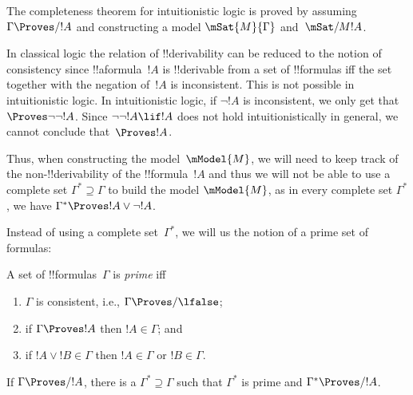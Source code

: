 \documentclass[../../../include/open-logic-section]{subfiles}
\begin{document}

The completeness theorem for intuitionistic logic is proved by assuming
$\Gamma \Proves/ !A$ and constructing a model $\mSat{M}{\Gamma}$ and~$\mSat/{M}{!A}$.

In classical logic the relation of !!{derivability} can be reduced to
the notion of consistency since !!a{formula}~$!A$ is !!{derivable}
from a set of !!{formula}s iff the set together with the negation
of~$!A$ is inconsistent. This is not possible in intuitionistic logic.
In intuitionistic logic, if $\lnot!A$ is inconsistent, we only get
that $\Proves \lnot\lnot !A$. Since $\lnot\lnot!A \lif !A$ does not
hold intuitionistically in general, we cannot conclude that~$\Proves
!A$.

Thus, when constructing the model~$\mModel{M}$, we will need to keep track 
of the non-!!{derivability} of the !!{formula}~$!A$ and thus we will not be 
able to use a complete set $\Gamma^* \supseteq \Gamma$ to build the model
$\mModel{M}$, as in every complete set $\Gamma^*$, we have
$\Gamma^* \Proves !A \lor \lnot !A$.

Instead of using a complete set~$\Gamma^*$, we will us the notion of
a prime set of formulas:

\begin{defn}
  A set of !!{formula}s~$\Gamma$ is \emph{prime} iff 
  \begin{enumerate}
  \item{} $\Gamma$ is consistent, i.e., $\Gamma \Proves/ \lfalse$;
  \item{} if $\Gamma \Proves !A$ then $!A \in \Gamma$; and
  \item{} if $!A \lor !B \in \Gamma$ then $!A \in
    \Gamma$ or $!B \in \Gamma$.
  \end{enumerate}
\end{defn}

\begin{lem}
   If $\Gamma \Proves/ !A$, there is a
  $\Gamma^* \supseteq \Gamma$ such that $\Gamma^*$ is prime and
  $\Gamma^* \Proves/ !A$.
\end{lem}
\end{document}
